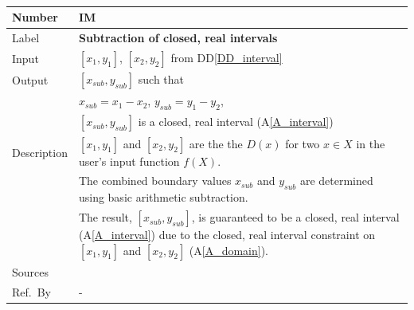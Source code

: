 \documentclass[12pt]{article}
\newcommand{\colAwidth}{0.13\textwidth}
\newcommand{\colBwidth}{0.82\textwidth}
\newcommand{\ddref}[1]{DD\ref{#1}}
\newcommand{\aref}[1]{A\ref{#1}}
\newcounter{instnum} %
\begin{document}
~\newline

\noindent
\begin{minipage}{\textwidth}
	\renewcommand*{\arraystretch}{1.5}
	\begin{tabular}{| p{\colAwidth} | p{\colBwidth}|}
		\hline
		\rowcolor[gray]{0.9}
		Number& IM{instnum}\theinstnum \label{I_subtraction}\\
		\hline
		Label& \bf Subtraction of closed, real intervals\\
		\hline
		Input&$[x_{1}, y_{1}]$, $[x_{2}, y_{2}]$ from \ddref{DD_interval}\\
		\hline
		Output&$[x_{sub}, y_{sub}]$ such that\\
		&$x_{sub} = x_{1} - x_{2}$, $y_{sub} = y_{1} - y_{2}$,\\
		&$[x_{sub}, y_{sub}]$ is a closed, real interval (\aref{A_interval}) \\
		\hline
		Description&$[x_{1}, y_{1}]$ and $[x_{2}, y_{2}]$ are the the $D(x)$ 
		for two $x \in X$ in the user's input function $f(X)$. \\
		&The combined boundary values $x_{sub}$ and  $y_{sub}$ are determined 
		using basic arithmetic subtraction.\\
		& The result, $[x_{sub}, y_{sub}]$, is guaranteed to be a closed, real 
		interval (\aref{A_interval}) due to the closed, real interval 
		constraint on $[x_{1}, y_{1}]$ and $[x_{2}, y_{2}]$ (\aref{A_domain}).
		\\
		\hline
		Sources& ~\cite{intervalarithmetic} \ \\
		\hline
		Ref.\ By & -\\
		\hline
	\end{tabular}
\end{minipage}\\

~\newline
\end{document}

